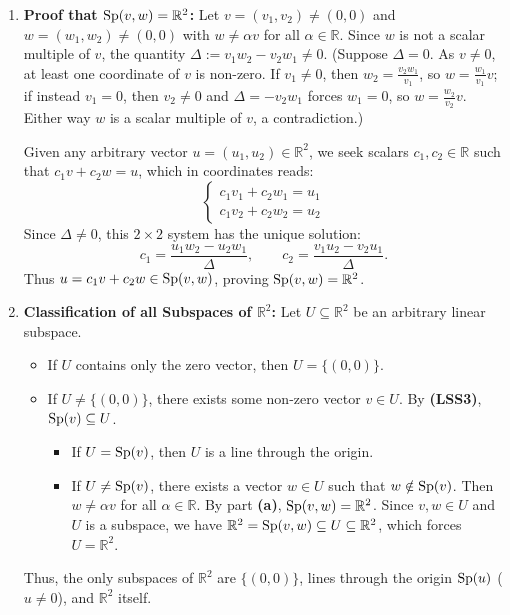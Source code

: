 \begin{exercisesolution}
\label{sol:subspaces_two_dimensions}
\begin{enumerate}[label=\textbf{(\alph*)}]
    \item \textbf{Proof that $\operatorname{Sp}(v, w) = \mathbb{R}^2$:}
    Let $v = (v_1, v_2) \ne (0, 0)$ and $w = (w_1, w_2) \ne (0, 0)$ with $w \ne \alpha v$ for all $\alpha \in \mathbb{R}$.
    Since $w$ is not a scalar multiple of $v$, the quantity $\Delta := v_1 w_2 - v_2 w_1 \ne 0$. (Suppose $\Delta = 0$. As $v \ne 0$, at least one coordinate of $v$ is non-zero. If $v_1 \ne 0$, then $w_2 = \frac{v_2 w_1}{v_1}$, so $w = \frac{w_1}{v_1} v$; if instead $v_1 = 0$, then $v_2 \ne 0$ and $\Delta = -v_2 w_1$ forces $w_1 = 0$, so $w = \frac{w_2}{v_2} v$. Either way $w$ is a scalar multiple of $v$, a contradiction.)
    
    Given any arbitrary vector $u = (u_1, u_2) \in \mathbb{R}^2$, we seek scalars $c_1, c_2 \in \mathbb{R}$ such that $c_1 v + c_2 w = u$, which in coordinates reads:
    \[
    \begin{cases}
    c_1 v_1 + c_2 w_1 = u_1 \\
    c_1 v_2 + c_2 w_2 = u_2
    \end{cases}
    \]
    Since $\Delta \ne 0$, this $2 \times 2$ system has the unique solution:
    \[
    c_1 = \frac{u_1 w_2 - u_2 w_1}{\Delta}, \qquad c_2 = \frac{v_1 u_2 - v_2 u_1}{\Delta}.
    \]
    Thus $u = c_1 v + c_2 w \in \operatorname{Sp}(v, w)$, proving $\operatorname{Sp}(v, w) = \mathbb{R}^2$.

    \item \textbf{Classification of all Subspaces of $\mathbb{R}^2$:}
    Let $U \subseteq \mathbb{R}^2$ be an arbitrary linear subspace.
    \begin{itemize}
        \item If $U$ contains only the zero vector, then $U = \{(0, 0)\}$.
        \item If $U \ne \{(0, 0)\}$, there exists some non-zero vector $v \in U$. By \textbf{(LSS3)}, $\operatorname{Sp}(v) \subseteq U$.
        \begin{itemize}
            \item If $U = \operatorname{Sp}(v)$, then $U$ is a line through the origin.
            \item If $U \ne \operatorname{Sp}(v)$, there exists a vector $w \in U$ such that $w \notin \operatorname{Sp}(v)$. Then $w \ne \alpha v$ for all $\alpha \in \mathbb{R}$. By part \textbf{(a)}, $\operatorname{Sp}(v, w) = \mathbb{R}^2$. Since $v, w \in U$ and $U$ is a subspace, we have $\mathbb{R}^2 = \operatorname{Sp}(v, w) \subseteq U \subseteq \mathbb{R}^2$, which forces $U = \mathbb{R}^2$.
        \end{itemize}
    \end{itemize}
    Thus, the only subspaces of $\mathbb{R}^2$ are $\{(0, 0)\}$, lines through the origin $\operatorname{Sp}(u)$ ($u \ne 0$), and $\mathbb{R}^2$ itself.
\end{enumerate}
\end{exercisesolution}

